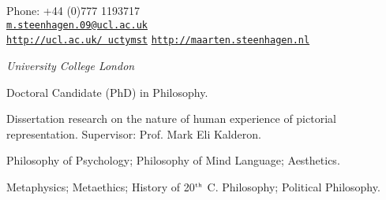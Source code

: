 \documentclass[11pt]{article}
\makeatletter
\def\myemail{m.steenhagen.09@ucl.ac.uk}
\def\myweb{http://ucl.ac.uk/\string~uctymst}
\def\myblog{http://maarten.steenhagen.nl}
\def\myphone{+44 (0)777 1193717}
\makeatother
\begin{document}
\begin{minipage}[t]{2.95in}
  
\end{minipage}
\hfill     
\hfill
\begin{minipage}[t]{1.7in}
  \flushright \footnotesize Phone: \myphone \\  
  {\scriptsize  \texttt{\href{mailto:\myemail}{\myemail}}} \\
  {\scriptsize  \texttt{\href{\myweb}{\myweb}}}
	{\scriptsize  \texttt{\href{\myblog}{\myblog}}}
\end{minipage}


\vfil

\reversemarginpar

\bigskip       

\medskip


\noindent\emph{University College London \vspace{0.01in}}

\ind Doctoral Candidate (PhD) in Philosophy.

\ind Dissertation research on the nature of human experience of pictorial representation. Supervisor: Prof. Mark Eli Kalderon.

\bigskip
\bigskip


\ind Philosophy of Psychology; Philosophy of Mind \amper Language; Aesthetics.

\bigskip
\bigskip


\ind Metaphysics; Metaethics; History of 20$^{\textrm{\tiny{th}}}$ C. Philosophy; Political Philosophy. 

\bigskip
\bigskip
\vfil 
{}
\end{document}
